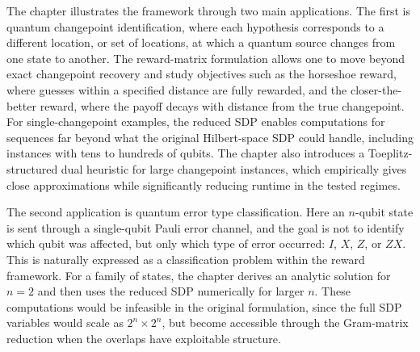 The chapter illustrates the framework through two main applications. 
The first is quantum changepoint identification, where each hypothesis corresponds to a different location, or set of locations, at which a quantum source changes from one state to another. 
The reward-matrix formulation allows one to move beyond exact changepoint recovery and study objectives such as the horseshoe reward, where guesses within a specified distance are fully rewarded, and the closer-the-better reward, where the payoff decays with distance from the true changepoint. 
For single-changepoint examples, the reduced SDP enables computations for sequences far beyond what the original Hilbert-space SDP could handle, including instances with tens to hundreds of qubits. 
The chapter also introduces a Toeplitz-structured dual heuristic for large changepoint instances, which empirically gives close approximations while significantly reducing runtime in the tested regimes. 

The second application is quantum error type classification. Here an $n$-qubit state is sent through a single-qubit Pauli error channel, and the goal is not to identify which qubit was affected, but only which type of error occurred: $I$, $X$, $Z$, or $ZX$. This is naturally expressed as a classification problem within the reward framework. 
For a family of states, the chapter derives an analytic solution for $n=2$ and then uses the reduced SDP numerically for larger $n$. 
These computations would be infeasible in the original formulation, since the full SDP variables would scale as $2^n \times 2^n$, but become accessible through the Gram-matrix reduction when the overlaps have exploitable structure. 
 
